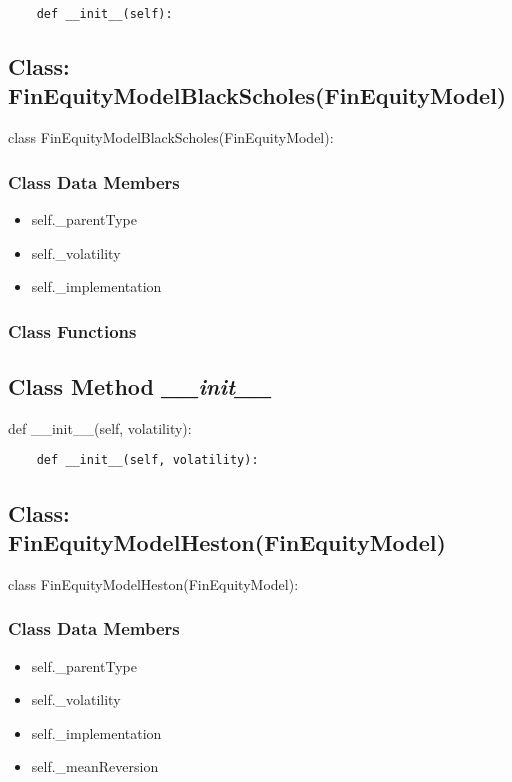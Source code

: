 \documentclass[twoside,11pt]{book}
\begin{document}
\begin{lstlisting}
    def __init__(self):
\end{lstlisting}

\subsection{Class: FinEquityModelBlackScholes(FinEquityModel)}
class FinEquityModelBlackScholes(FinEquityModel):

\subsubsection{Class Data Members}
\begin{itemize}
\item{self.\_parentType}
\item{self.\_volatility}
\item{self.\_implementation}
\end{itemize}

\subsubsection{Class Functions}

\subsection{Class Method {\it \_\_init\_\_}}
def \_\_init\_\_(self, volatility):

\begin{lstlisting}
    def __init__(self, volatility):
\end{lstlisting}

\subsection{Class: FinEquityModelHeston(FinEquityModel)}
class FinEquityModelHeston(FinEquityModel):

\subsubsection{Class Data Members}
\begin{itemize}
\item{self.\_parentType}
\item{self.\_volatility}
\item{self.\_implementation}
\item{self.\_meanReversion}
\end{itemize}
\end{document}
